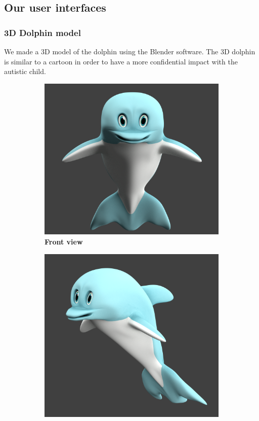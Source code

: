 \documentclass [12pt]{article}
\begin{document}
\subsection{Our user interfaces}
\subsubsection{3D Dolphin model}
We made a 3D model of the dolphin using the Blender software. The 3D dolphin is similar to a cartoon in order to have a more confidential impact with the autistic child.  
\begin{figure}[h!]
\centering
\hspace*{\fill}
\begin{subfigure}[tl]{0.3\linewidth}
\includegraphics[width=\linewidth]{FrontRenderpng.png}
\caption{\textbf{Front view}}
\end{subfigure}\hfill
\begin{subfigure}[tr]{0.3\linewidth}
\includegraphics[width=\linewidth]{FiancoRender2.png}

\end{subfigure}
\end{figure}
\end{document}
